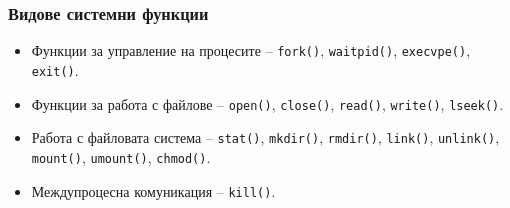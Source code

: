 \documentclass[ignorenonframetext, hyperref=unicode]{beamer}
\begin{document}
\begin{frame}[containsverbatim]
\frametitle{Видове системни функции}
\begin{itemize}
\item Функции за управление на процесите -- \lstinline{fork()},
\lstinline{waitpid()}, \lstinline{execvpe()}, \lstinline{exit()}.
\item Функции за работа с файлове -- \lstinline{open()}, \lstinline{close()},
\lstinline{read()}, \lstinline{write()}, \lstinline{lseek()}.
\item Работа с файловата система -- \lstinline{stat()}, \lstinline{mkdir()},
\lstinline{rmdir()}, \lstinline{link()}, \lstinline{unlink()},
\lstinline{mount()}, \lstinline{umount()}, \lstinline{chmod()}.
\item Междупроцесна комуникация -- \lstinline{kill()}.
\end{itemize}
\end{frame}
\end{document}
